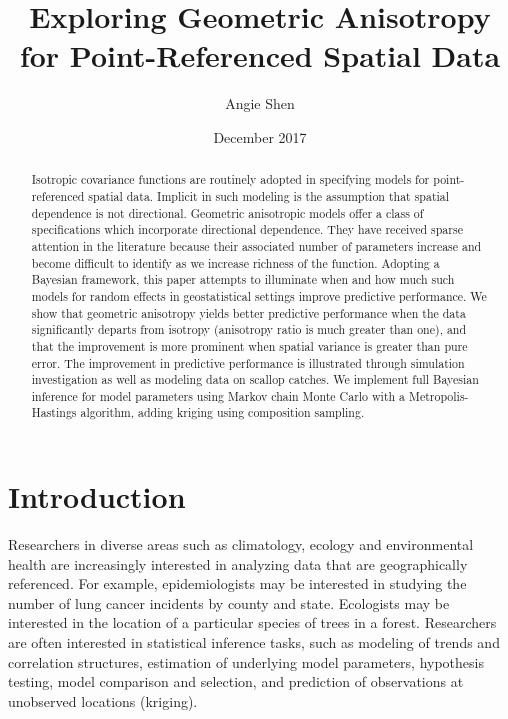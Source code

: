 \documentclass[12pt,twoside]{dukestatscithesis}
\title{Exploring Geometric Anisotropy for Point-Referenced Spatial Data}
\author{Angie Shen}
\date{December 2017}
\theoremstyle{definition}
\theoremstyle{definition}
\theoremstyle{definition}
\theoremstyle{remark}
\begin{document}
  \maketitle

\frontmatter %
\pagestyle{empty} %



  \hypersetup{linkcolor=black}
  \setcounter{tocdepth}{2}
  \tableofcontents

  \listoftables

  \listoffigures
  \begin{abstract}
    Isotropic covariance functions are routinely adopted in specifying
    models for point-referenced spatial data. Implicit in such modeling is
    the assumption that spatial dependence is not directional. Geometric
    anisotropic models offer a class of specifications which incorporate
    directional dependence. They have received sparse attention in the
    literature because their associated number of parameters increase and
    become difficult to identify as we increase richness of the function.
    Adopting a Bayesian framework, this paper attempts to illuminate when
    and how much such models for random effects in geostatistical settings
    improve predictive performance. We show that geometric anisotropy yields
    better predictive performance when the data significantly departs from
    isotropy (anisotropy ratio is much greater than one), and that the
    improvement is more prominent when spatial variance is greater than pure
    error. The improvement in predictive performance is illustrated through
    simulation investigation as well as modeling data on scallop catches. We
    implement full Bayesian inference for model parameters using Markov
    chain Monte Carlo with a Metropolis-Hastings algorithm, adding kriging
    using composition sampling.
  \end{abstract}

\mainmatter %
\pagestyle{fancyplain} %

\chapter*{Introduction}\label{introduction}

Researchers in diverse areas such as climatology, ecology and
environmental health are increasingly interested in analyzing data that
are geographically referenced. For example, epidemiologists may be
interested in studying the number of lung cancer incidents by county and
state. Ecologists may be interested in the location of a particular
species of trees in a forest. Researchers are often interested in
statistical inference tasks, such as modeling of trends and correlation
structures, estimation of underlying model parameters, hypothesis
testing, model comparison and selection, and prediction of observations
at unobserved locations (kriging).
\end{document}
